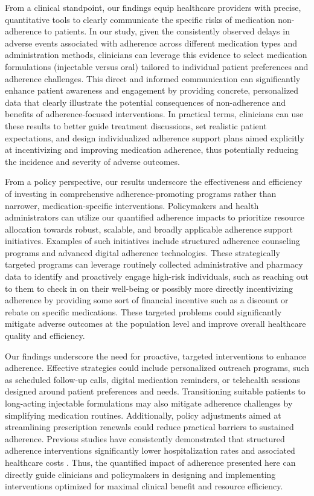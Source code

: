 From a clinical standpoint, our findings equip healthcare providers with precise, quantitative tools to clearly communicate the specific risks of medication non-adherence to patients.
In our study, given the consistently observed delays in adverse events associated with adherence across different medication types and administration methods, clinicians can leverage this evidence to select medication formulations (injectable versus oral) tailored to individual patient preferences and adherence challenges.
This direct and informed communication can significantly enhance patient awareness and engagement by providing concrete, personalized data that clearly illustrate the potential consequences of non-adherence and benefits of adherence-focused interventions.
In practical terms, clinicians can use these results to better guide treatment discussions, set realistic patient expectations, and design individualized adherence support plans aimed explicitly at incentivizing and improving medication adherence, thus potentially reducing the incidence and severity of adverse outcomes.

From a policy perspective, our results underscore the effectiveness and efficiency of investing in comprehensive adherence-promoting programs rather than narrower, medication-specific interventions.
Policymakers and health administrators can utilize our quantified adherence impacts to prioritize resource allocation towards robust, scalable, and broadly applicable adherence support initiatives.
Examples of such initiatives include structured adherence counseling programs and advanced digital adherence technologies.
These strategically targeted programs can leverage routinely collected administrative and pharmacy data to identify and proactively engage high-risk individuals, such as reaching out to them to check in on their well-being or possibly more directly incentivizing adherence by providing some sort of financial incentive such as a discount or rebate on specific medications.
These targeted problems could significantly mitigate adverse outcomes at the population level and improve overall healthcare quality and efficiency.

Our findings underscore the need for proactive, targeted interventions to enhance adherence.
Effective strategies could include personalized outreach programs, such as scheduled follow-up calls, digital medication reminders, or telehealth sessions designed around patient preferences and needs.
Transitioning suitable patients to long-acting injectable formulations may also mitigate adherence challenges by simplifying medication routines.
Additionally, policy adjustments aimed at streamlining prescription renewals could reduce practical barriers to sustained adherence.
Previous studies have consistently demonstrated that structured adherence interventions significantly lower hospitalization rates and associated healthcare costs \citep{velligan2009expert, kane2016comprehensive}.
Thus, the quantified impact of adherence presented here can directly guide clinicians and policymakers in designing and implementing interventions optimized for maximal clinical benefit and resource efficiency.


